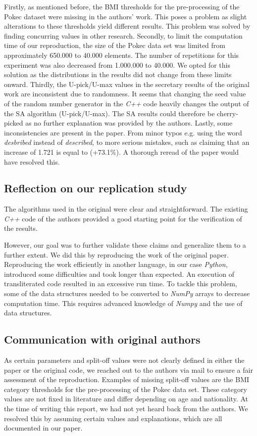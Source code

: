 Firstly, as mentioned before, the BMI thresholds for the pre-processing of the Pokec dataset were missing in the authors' work. This poses a problem as slight alterations to these thresholds yield different results. This problem was solved by finding concurring values in other research. Secondly, to limit the computation time of our reproduction, the size of the Pokec data set was limited from approximately 650.000 to 40.000 elements. The number of repetitions for this experiment was also decreased from 1.000.000 to 40.000. We opted for this solution as the distributions in the results did not change from these limits onward. Thirdly, the U-pick/U-max values in the secretary results of the original work are inconsistent due to randomness. It seems that changing the seed value of the random number generator in the \textit{C++} code heavily changes the output of the SA algorithm (U-pick/U-max). The SA results could therefore be cherry-picked as no further explanation was provided by the authors. Lastly, some inconsistencies are present in the paper. From minor typos e.g. using the word \textit{desbribed} instead of \textit{described}, to more serious mistakes, such as claiming that an increase of 1.721 is equal to (+73.1\%). A thorough reread of the paper would have resolved this.

\subsection{Reflection on our replication study}
The algorithms used in the original were clear and straightforward. The existing \textit{C++} code of the authors provided a good starting point for the verification of the results.

However, our goal was to further validate these claims and generalize them to a further extent. We did this by reproducing the work of the original paper. Reproducing the work efficiently in another language, in our case \textit{Python}, introduced some difficulties and took longer than expected. An execution of transliterated code resulted in an excessive run time. To tackle this problem, some of the data structures needed to be converted to \textit{NumPy} arrays to decrease computation time. This requires advanced knowledge of \textit{Numpy} and the use of data structures.

\subsection{Communication with original authors}
As certain parameters and split-off values were not clearly defined in either the paper or the original code, we reached out to the authors via mail to ensure a fair assessment of the reproduction. Examples of missing split-off values are the BMI category thresholds for the pre-processing of the Pokec data set. These category values are not fixed in literature and differ depending on age and nationality. At the time of writing this report, we had not yet heard back from the authors. We resolved this by assuming certain values and explanations, which are all documented in our paper.
